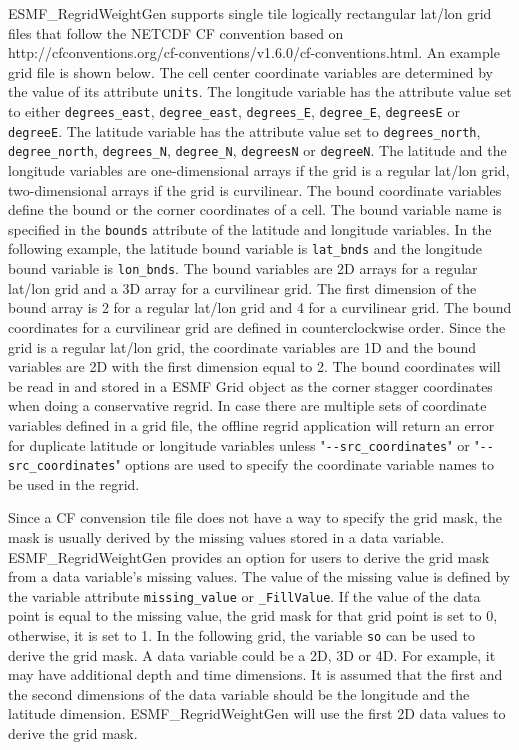 ESMF\_RegridWeightGen supports single tile logically rectangular lat/lon grid files that follow the NETCDF CF convention based on
 {http://cfconventions.org/cf-conventions/v1.6.0/cf-conventions.html}.   An example grid file is shown below.
The cell center coordinate variables are determined by the value of its attribute {\tt units}.  The longitude
variable has the attribute value set to either {\tt degrees\_east}, {\tt degree\_east}, {\tt degrees\_E}, {\tt degree\_E},
{\tt degreesE} or {\tt degreeE}.  The latitude variable has the attribute value set to {\tt degrees\_north}, {\tt degree\_north}, {\tt degrees\_N},
{\tt degree\_N}, {\tt degreesN} or {\tt degreeN}.   The latitude and the longitude variables are one-dimensional arrays if the grid is a regular lat/lon grid, two-dimensional arrays if the grid is curvilinear. The bound coordinate
variables define the bound or the corner coordinates of a cell.  The bound variable name is specified in the
{\tt bounds} attribute of the latitude and longitude variables.  In the following example, the latitude bound
variable is {\tt lat\_bnds} and the longitude bound variable is {\tt lon\_bnds}.  The bound variables are 2D
arrays for a regular lat/lon grid and a 3D array for a curvilinear grid.  The first dimension of the bound
array is 2 for a regular lat/lon grid and 4 for a curvilinear grid.  The bound coordinates for a curvilinear
grid are defined in counterclockwise order. Since the grid is a regular lat/lon grid,
the coordinate variables are 1D and the bound variables are 2D with the first dimension equal to 2.
The bound coordinates will be read in and stored in a ESMF Grid object as the corner stagger coordinates when doing a conservative regrid.  In case there are multiple sets of coordinate variables defined in a grid file,
the offline regrid application will return an error for duplicate latitude or longitude variables unless
"{\tt \verb+--+src\_coordinates}" or "{\tt \verb+--+src\_coordinates}" options are used to specify the coordinate variable names
to be used in the regrid.

Since a CF convension tile file does not have a way to specify the grid mask, the mask is usually derived by the missing values stored in a data variable.  ESMF\_RegridWeightGen provides an option for users to
derive the grid mask from a data variable's missing values.  The value of the missing value is defined by the
variable attribute {\tt missing\_value} or {\tt \_FillValue}.  If the value of the data point is equal to the
missing value, the grid mask for that grid point is set to 0, otherwise, it is set to 1.   In the following
grid, the variable {\tt so} can be used to derive the grid mask.  A data variable could be a 2D, 3D or 4D.
For example, it may have additional depth and time dimensions.
It is assumed that the first and the second dimensions of the data variable should be the longitude and the
latitude dimension.  ESMF\_RegridWeightGen will use the first 2D data values to derive the grid mask.

